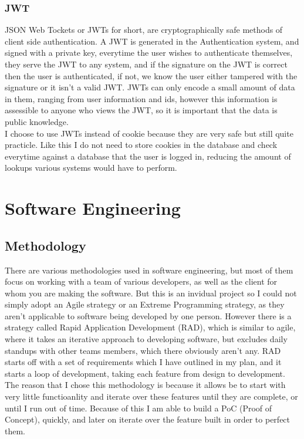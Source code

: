 \documentclass[titlepage]{article}
\begin{document}
\subsubsection{JWT}
JSON Web Tockets or JWTs for short, are cryptographically safe methods of client side authentication. A JWT is generated in the Authentication system, and signed with a private key, everytime the user wishes to authenticate themselves, they serve the JWT to any system, and if the signature on the JWT is correct then the user is authenticated, if not, we know the user either tampered with the signature or it isn't a valid JWT. JWTs can only encode a small amount of data in them, ranging from user information and ids, however this information is assessible to anyone who views the JWT, so it is important that the data is public knowledge. \\

I choose to use JWTs instead of cookie because they are very safe but still quite practicle. Like this I do not need to store cookies in the database and check everytime against a database that the user is logged in, reducing the amount of lookups various systems would have to perform.

\section{Software Engineering}

\subsection{Methodology}
There are various methodologies used in software engineering, but most of them focus on working with a team of various developers, as well as the client for whom you are making the software. But this is an invidual project so I could not simply adopt an Agile strategy or an Extreme Programming strategy, as they aren't applicable to software being developed by one person. However there is a strategy called Rapid Application Development (RAD), which is similar to agile, where it takes an iterative approach to developing software, but excludes daily standups with other teams members, which there obviously aren't any. RAD starts off with a set of requirements which I have outlined in my plan, and it starts a loop of development, taking each feature from design to development. The reason that I chose this methodology is because it allows be to start with very little functioanlity and iterate over these features until they are complete, or until I run out of time. Because of this I am able to build a PoC (Proof of Concept), quickly, and later on iterate over the feature built in order to perfect them.
\end{document}
